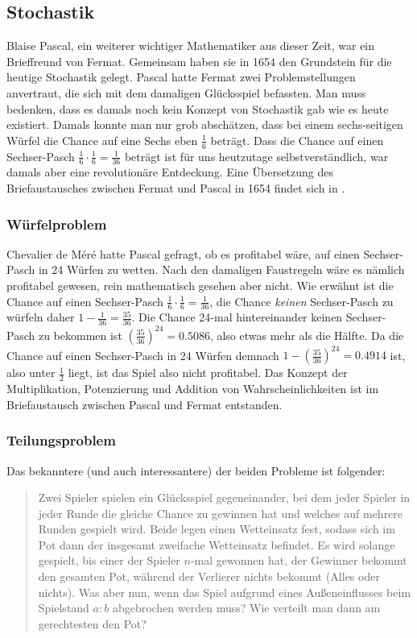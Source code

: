 \subsection{Stochastik} \label{sec:stochastik}
Blaise Pascal, ein weiterer wichtiger Mathematiker aus dieser Zeit, war ein Brieffreund von Fermat. Gemeinsam haben sie in 1654 den Grundstein für die heutige \Gls{Stochastik} gelegt. Pascal hatte Fermat zwei Problemstellungen anvertraut, die sich mit dem damaligen Glücksspiel befassten. Man muss bedenken, dass es damals noch kein Konzept von Stochastik gab wie es heute existiert. Damals konnte man nur grob abschätzen, dass bei einem sechs-seitigen Würfel die Chance auf eine Sechs eben $\frac{1}{6}$ beträgt. Dass die Chance auf einen Sechser-Pasch $\frac{1}{6} \cdot \frac{1}{6} = \frac{1}{36}$ beträgt ist für uns heutzutage selbstverständlich, war damals aber eine revolutionäre Entdeckung. Eine Übersetzung des Briefaustausches zwischen Fermat und Pascal in 1654 findet sich in \cite{fermatPascalProb}.

\subsubsection{Würfelproblem}
Chevalier de Méré hatte Pascal gefragt, ob es profitabel wäre, auf einen Sechser-Pasch in 24 Würfen zu wetten. Nach den damaligen Faustregeln wäre es nämlich profitabel gewesen, rein mathematisch gesehen aber nicht. Wie erwähnt ist die Chance auf einen Sechser-Pasch $\frac{1}{6} \cdot \frac{1}{6} = \frac{1}{36}$, die Chance \textit{keinen} Sechser-Pasch zu würfeln daher $1 - \frac{1}{36} = \frac{35}{36}$. Die Chance 24-mal hintereinander keinen Sechser-Pasch zu bekommen ist $(\frac{35}{36})^{24} = 0.5086$, also etwas mehr als die Hälfte. Da die Chance auf einen Sechser-Pasch in 24 Würfen demnach $1-(\frac{35}{36})^{24}=0.4914$ ist, also unter $\frac{1}{2}$ liegt, ist das Spiel also nicht profitabel. Das Konzept der Multiplikation, Potenzierung und Addition von Wahrscheinlichkeiten ist im Briefaustausch zwischen Pascal und Fermat entstanden.

\subsubsection{Teilungsproblem}
Das bekanntere (und auch interessantere) der beiden Probleme ist folgender:

\begin{quote}
    Zwei Spieler spielen ein Glücksspiel gegeneinander, bei dem jeder Spieler in jeder Runde die gleiche Chance zu gewinnen hat und welches auf mehrere Runden gespielt wird. Beide legen einen Wetteinsatz fest, sodass sich im Pot dann der insgesamt zweifache Wetteinsatz befindet. Es wird solange gespielt, bis einer der Spieler $n$-mal gewonnen hat, der Gewinner bekommt den gesamten Pot, während der Verlierer nichts bekommt (Alles oder nichts). Was aber nun, wenn das Spiel aufgrund eines Außeneinflusses beim Spielstand $a:b$ abgebrochen werden muss? Wie verteilt man dann am gerechtesten den Pot?
\end{quote}

